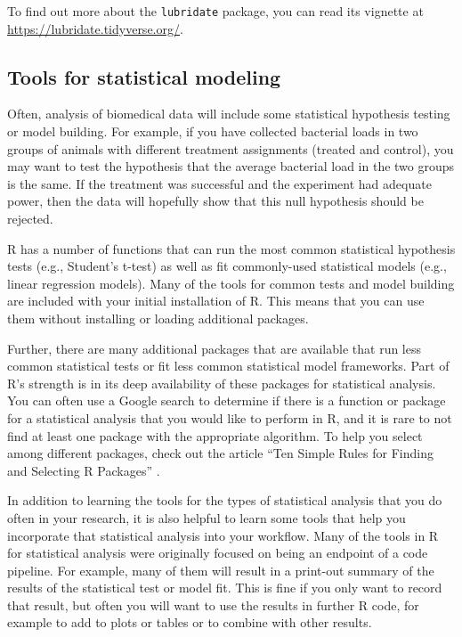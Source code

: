 \documentclass[]{tufte-book}
\begin{document}
To find out more about the \texttt{lubridate} package, you can read its vignette
at \url{https://lubridate.tidyverse.org/}.

\subsection{Tools for statistical modeling}\label{tools-for-statistical-modeling}

Often, analysis of biomedical data will include some statistical hypothesis
testing or model building. For example, if you have collected bacterial
loads in two groups of animals with different treatment assignments
(treated and control), you may want to test the hypothesis that the average
bacterial load in the two groups is the same. If the treatment was successful
and the experiment had adequate power, then the data will hopefully show that
this null hypothesis should be rejected.

R has a number of functions that can run the most common statistical
hypothesis tests (e.g., Student's t-test) as well as fit commonly-used
statistical models (e.g., linear regression models). Many of the tools
for common tests and model building are included with your initial installation
of R. This means that you can use them without installing or loading additional
packages.

Further, there are many additional packages that are available that run
less common statistical tests or fit less common statistical model frameworks.
Part of R's strength is in its deep availability of these packages for
statistical analysis. You can often use a Google search to determine if
there is a function or package for a statistical analysis that you would
like to perform in R, and it is rare to not find at least one package with
the appropriate algorithm. To help you select among different packages, check
out the article ``Ten Simple Rules for Finding and Selecting R Packages''
\citep{wendt2022ten}.

In addition to learning the tools for the types of statistical analysis
that you do often in your research, it is also helpful to learn some tools
that help you incorporate that statistical analysis into your workflow.
Many of the tools in R for statistical analysis were originally focused on
being an endpoint of a code pipeline. For example, many of them will result
in a print-out summary of the results of the statistical test or model fit.
This is fine if you only want to record that result, but often you will
want to use the results in further R code, for example to add to plots or
tables or to combine with other results.
\end{document}
